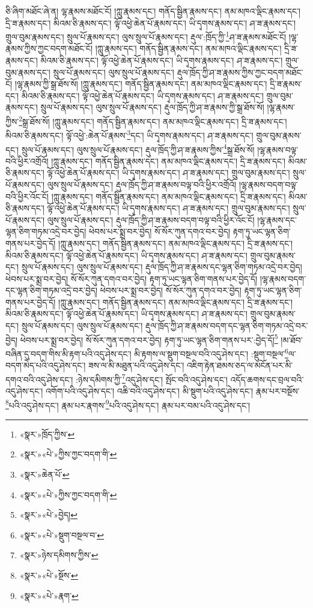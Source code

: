 ཅི་ཞིག་མཐོང་ཞེ་ན། ལྷ་རྣམས་མཐོང་ངོ། །ཀླུ་རྣམས་དང་། གནོད་སྦྱིན་རྣམས་དང་། ནམ་མཁའ་ལྡིང་རྣམས་དང་། དྲི་ཟ་རྣམས་དང་། མིའམ་ཅི་རྣམས་དང་། ལྟོ་འཕྱེ་ཆེན་པོ་རྣམས་དང་། ཡི་དྭགས་རྣམས་དང་། ཤ་ཟ་རྣམས་དང་། གྲུལ་བུམ་རྣམས་དང་། སྲུལ་པོ་རྣམས་དང་། ལུས་སྲུལ་པོ་རྣམས་དང་། རྡུལ་:ཁྲོད་ཀྱི་\footnote{«སྣར་»ཁྲོད་ཀྱིས་}ཤ་ཟ་རྣམས་མཐོང་ངོ། །ལྷ་རྣམས་ཀྱིས་ཀྱང་བདག་མཐོང་ངོ། །ཀླུ་རྣམས་དང་། གནོད་སྦྱིན་རྣམས་དང་། ནམ་མཁའ་ལྡིང་རྣམས་དང་། དྲི་ཟ་རྣམས་དང་། མིའམ་ཅི་རྣམས་དང་། ལྟོ་འཕྱེ་ཆེན་པོ་རྣམས་དང་། ཡི་དྭགས་རྣམས་དང་། ཤ་ཟ་རྣམས་དང་། གྲུལ་བུམ་རྣམས་དང་། སྲུལ་པོ་རྣམས་དང་། ལུས་སྲུལ་པོ་རྣམས་དང་། རྡུལ་ཁྲོད་ཀྱི་ཤ་ཟ་རྣམས་ཀྱིས་ཀྱང་བདག་མཐོང་ངོ། །ལྷ་རྣམས་ཀྱི་སྒྲ་ཐོས་སོ། །ཀླུ་རྣམས་དང་། གནོད་སྦྱིན་རྣམས་དང་། ནམ་མཁའ་ལྡིང་རྣམས་དང་། དྲི་ཟ་རྣམས་དང་། མིའམ་ཅི་རྣམས་དང་། ལྟོ་འཕྱེ་ཆེན་པོ་རྣམས་དང་། ཡི་དྭགས་རྣམས་དང་། ཤ་ཟ་རྣམས་དང་། གྲུལ་བུམ་རྣམས་དང་། སྲུལ་པོ་རྣམས་དང་། ལུས་སྲུལ་པོ་རྣམས་དང་། རྡུལ་ཁྲོད་ཀྱི་ཤ་ཟ་རྣམས་ཀྱི་སྒྲ་ཐོས་སོ། །ལྷ་རྣམས་ཀྱིས་\footnote{«སྣར་»«པེ་»ཀྱིས་ཀྱང་བདག་གི་}སྒྲ་ཐོས་སོ། །ཀླུ་རྣམས་དང་། གནོད་སྦྱིན་རྣམས་དང་། ནམ་མཁའ་ལྡིང་རྣམས་དང་། དྲི་ཟ་རྣམས་དང་། མིའམ་ཅི་རྣམས་དང་། ལྟོ་འཕྱེ་:ཆེན་པོ་རྣམས་\footnote{«སྣར་»ཆེན་པོ་}དང་། ཡི་དྭགས་རྣམས་དང་། ཤ་ཟ་རྣམས་དང་། གྲུལ་བུམ་རྣམས་དང་། སྲུལ་པོ་རྣམས་དང་། ལུས་སྲུལ་པོ་རྣམས་དང་། རྡུལ་ཁྲོད་ཀྱི་ཤ་ཟ་རྣམས་ཀྱིས་\footnote{«སྣར་»«པེ་»ཀྱིས་ཀྱང་བདག་གི་}སྒྲ་ཐོས་སོ། །ལྷ་རྣམས་བལྟ་བའི་ཕྱིར་འགྲོའོ། །ཀླུ་རྣམས་དང་། གནོད་སྦྱིན་རྣམས་དང་། ནམ་མཁའ་ལྡིང་རྣམས་དང་། དྲི་ཟ་རྣམས་དང་། མིའམ་ཅི་རྣམས་དང་། ལྟོ་འཕྱེ་ཆེན་པོ་རྣམས་དང་། ཡི་དྭགས་རྣམས་དང་། ཤ་ཟ་རྣམས་དང་། གྲུལ་བུམ་རྣམས་དང་། སྲུལ་པོ་རྣམས་དང་། ལུས་སྲུལ་པོ་རྣམས་དང་། རྡུལ་ཁྲོད་ཀྱི་ཤ་ཟ་རྣམས་བལྟ་བའི་ཕྱིར་འགྲོའོ། །ལྷ་རྣམས་བདག་བལྟ་བའི་ཕྱིར་འོང་ངོ། །ཀླུ་རྣམས་དང་། གནོད་སྦྱིན་རྣམས་དང་། ནམ་མཁའ་ལྡིང་རྣམས་དང་། དྲི་ཟ་རྣམས་དང་། མིའམ་ཅི་རྣམས་དང་། ལྟོ་འཕྱེ་ཆེན་པོ་རྣམས་དང་། ཡི་དྭགས་རྣམས་དང་། ཤ་ཟ་རྣམས་དང་། གྲུལ་བུམ་རྣམས་དང་། སྲུལ་པོ་རྣམས་དང་། ལུས་སྲུལ་པོ་རྣམས་དང་། རྡུལ་ཁྲོད་ཀྱི་ཤ་ཟ་རྣམས་བདག་བལྟ་བའི་ཕྱིར་འོང་ངོ། །ལྷ་རྣམས་དང་ལྷན་ཅིག་གཏམ་འདྲེ་བར་བྱེད། ཕེབས་པར་སྨྲ་བར་བྱེད། སོ་སོར་ཀུན་དགའ་བར་བྱེད། རྟག་ཏུ་ཡང་ལྷན་ཅིག་གནས་པར་བྱེད་དོ། །ཀླུ་རྣམས་དང་། གནོད་སྦྱིན་རྣམས་དང་། ནམ་མཁའ་ལྡིང་རྣམས་དང་། དྲི་ཟ་རྣམས་དང་། མིའམ་ཅི་རྣམས་དང་། ལྟོ་འཕྱེ་ཆེན་པོ་རྣམས་དང་། ཡི་དྭགས་རྣམས་དང་། ཤ་ཟ་རྣམས་དང་། གྲུལ་བུམ་རྣམས་དང་། སྲུལ་པོ་རྣམས་དང་། ལུས་སྲུལ་པོ་རྣམས་དང་། རྡུལ་ཁྲོད་ཀྱི་ཤ་ཟ་རྣམས་དང་ལྷན་ཅིག་གཏམ་འདྲེ་བར་བྱེད། ཕེབས་པར་སྨྲ་བར་བྱེད། སོ་སོར་ཀུན་དགའ་བར་བྱེད། རྟག་ཏུ་ཡང་ལྷན་ཅིག་གནས་པར་བྱེད་དོ། །ལྷ་རྣམས་བདག་དང་ལྷན་ཅིག་གཏམ་འདྲེ་བར་བྱེད། ཕེབས་པར་སྨྲ་བར་བྱེད། སོ་སོར་ཀུན་དགའ་བར་བྱེད། རྟག་ཏུ་ཡང་ལྷན་ཅིག་གནས་པར་བྱེད་དོ། །ཀླུ་རྣམས་དང་། གནོད་སྦྱིན་རྣམས་དང་། ནམ་མཁའ་ལྡིང་རྣམས་དང་། དྲི་ཟ་རྣམས་དང་། མིའམ་ཅི་རྣམས་དང་། ལྟོ་འཕྱེ་ཆེན་པོ་རྣམས་དང་། ཡི་དྭགས་རྣམས་དང་། ཤ་ཟ་རྣམས་དང་། གྲུལ་བུམ་རྣམས་དང་། སྲུལ་པོ་རྣམས་དང་། ལུས་སྲུལ་པོ་རྣམས་དང་། རྡུལ་ཁྲོད་ཀྱི་ཤ་ཟ་རྣམས་བདག་དང་ལྷན་ཅིག་གཏམ་འདྲེ་བར་བྱེད། ཕེབས་པར་སྨྲ་བར་བྱེད། སོ་སོར་ཀུན་དགའ་བར་བྱེད། རྟག་ཏུ་ཡང་ལྷན་ཅིག་གནས་པར་:བྱེད་དོ།\footnote{«སྣར་»«པེ་»བྱེད།} །མ་ཐོབ་བཞིན་དུ་བདག་གིས་མི་རྟག་པའི་འདུ་ཤེས་དང་། མི་རྟགས་ལ་སྡུག་བསྔལ་བའི་འདུ་ཤེས་དང་། :སྡུག་བསྔལ་\footnote{«སྣར་»«པེ་»སྡུག་བསྔལ་བ་}ལ་བདག་མེད་པའི་འདུ་ཤེས་དང་། ཟས་ལ་མི་མཐུན་པའི་འདུ་ཤེས་དང་། འཇིག་རྟེན་ཐམས་ཅད་ལ་མངོན་པར་མི་དགའ་བའི་འདུ་ཤེས་དང་། :ཉེས་དམིགས་ཀྱི་\footnote{«སྣར་»ཉེས་དམིགས་ཀྱིས་}འདུ་ཤེས་དང་། སྤོང་བའི་འདུ་ཤེས་དང་། འདོད་ཆགས་དང་བྲལ་བའི་འདུ་ཤེས་དང་། འགོག་པའི་འདུ་ཤེས་དང་། འཆི་བའི་འདུ་ཤེས་དང་། མི་སྡུག་པའི་འདུ་ཤེས་དང་། རྣམ་པར་བསྔོས་\footnote{«སྣར་»«པེ་»སྔོས་}པའི་འདུ་ཤེས་དང་། རྣམ་པར་རྣགས་\footnote{«སྣར་»«པེ་»རྣག་}པའི་འདུ་ཤེས་དང་། རྣམ་པར་བམ་པའི་འདུ་ཤེས་དང་། 